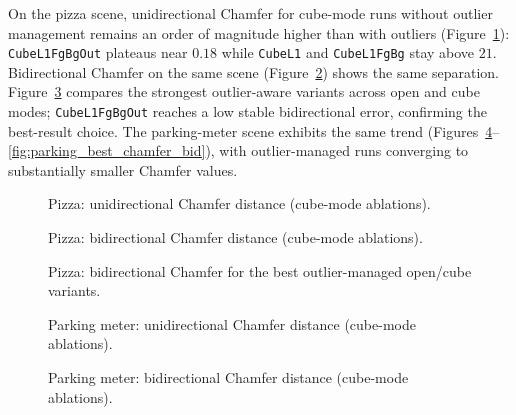 \documentclass{report}
\begin{document}
On the pizza scene, unidirectional Chamfer for cube-mode runs without outlier management remains an order of magnitude higher than with outliers (Figure~\ref{fig:pizza_cube_chamfer_uni}): \texttt{CubeL1FgBgOut} plateaus near $0.18$ while \texttt{CubeL1} and \texttt{CubeL1FgBg} stay above $21$. Bidirectional Chamfer on the same scene (Figure~\ref{fig:pizza_cube_chamfer_bid}) shows the same separation. Figure~\ref{fig:pizza_best_chamfer_bid} compares the strongest outlier-aware variants across open and cube modes; \texttt{CubeL1FgBgOut} reaches a low stable bidirectional error, confirming the best-result choice. The parking-meter scene exhibits the same trend (Figures~\ref{fig:parking_cube_chamfer_uni}--\ref{fig:parking_best_chamfer_bid}), with outlier-managed runs converging to substantially smaller Chamfer values.

\begin{figure}[H]
    \centering
    \caption{Pizza: unidirectional Chamfer distance (cube-mode ablations).}
    \label{fig:pizza_cube_chamfer_uni}
\end{figure}

\begin{figure}[H]
    \centering
    \caption{Pizza: bidirectional Chamfer distance (cube-mode ablations).}
    \label{fig:pizza_cube_chamfer_bid}
\end{figure}

\begin{figure}[H]
    \centering
    \caption{Pizza: bidirectional Chamfer for the best outlier-managed open/cube variants.}
    \label{fig:pizza_best_chamfer_bid}
\end{figure}

\begin{figure}[H]
    \centering
    \caption{Parking meter: unidirectional Chamfer distance (cube-mode ablations).}
    \label{fig:parking_cube_chamfer_uni}
\end{figure}

\begin{figure}[H]
    \centering
    \caption{Parking meter: bidirectional Chamfer distance (cube-mode ablations).}
    \label{fig:parking_cube_chamfer_bid}
\end{figure}
\end{document}
